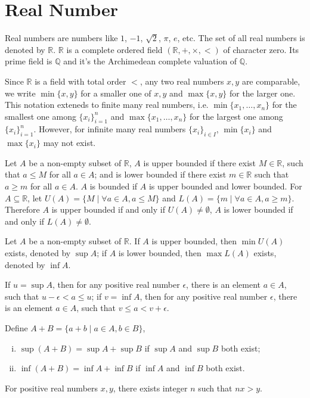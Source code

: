 \section{Real Number}
Real numbers are numbers like $1$, $-1$, $\sqrt 2$, $\pi$, $e$, etc.
The set of all real numbers is denoted by $\mathbb R$.
$\mathbb R$ is a complete ordered field $(\mathbb{R}, +, \times, <)$ of character zero.
Its prime field is $\mathbb{Q}$ and it's the Archimedean complete valuation of $\mathbb{Q}$.

Since $\mathbb{R}$ is a field with total order $<$, any two real numbers $x, y$ are comparable,
we write $\min\{x, y\}$ for a smaller one of $x, y$ and $\max\{x, y\}$ for the larger one.
This notation exteneds to finite many real numbers, i.e.
$\min\{x_1, \dots, x_n\}$ for the smallest one among $\{x_i\}_{i=1}^n$
and $\max\{x_1, \dots, x_n\}$ for the largest one among $\{x_i\}_{i=1}^n$.
However, for infinite many real numbers $\{x_i\}_{i \in I}$, $\min\{x_i\}$ and $\max\{x_i\}$ may not exist.

Let $A$ be a non-empty subset of $\mathbb{R}$, $A$ is upper bounded if there exist $M \in \mathbb{R}$,
such that $a \leq M$ for all $a \in A$;
and is lower bounded if there exist $m \in \mathbb{R}$ such that $a \geq m$ for all $a \in A$.
$A$ is bounded if $A$ is upper bounded and lower bounded.
For $A \subseteq \mathbb{R}$, let $U(A) = \{M \mid \forall a \in A, a \leq M\}$
and $L(A) = \{m \mid \forall a \in A, a \geq m\}$.
Therefore $A$ is upper bounded if and only if $U(A) \neq \emptyset$,
$A$ is lower bounded if and only if $L(A) \neq \emptyset$.

Let $A$ be a non-empty subset of $\mathbb{R}$.
If $A$ is upper bounded, then $\min U(A)$ exists, denoted by $\sup A$;
if $A$ is lower bounded, then $\max L(A)$ exists, denoted by $\inf A$.

\begin{pro}
If $u = \sup A$, then for any positive real number $\epsilon$, there is an element $a \in A$,
such that $u - \epsilon < a \leq u$;
if $v = \inf A$, then for any positive real number $\epsilon$, there is an element $a \in A$,
such that $v \leq a < v + \epsilon$.
\end{pro}

\begin{pro}
Define $A + B = \{a + b \mid a \in A, b \in B\}$,
\begin{enumerate}[i.]
\item $\sup(A + B) = \sup A + \sup B$ if $\sup A$ and $\sup B$ both exist;
\item $\inf(A + B) = \inf A + \inf B$ if $\inf A$ and $\inf B$ both exist.
\end{enumerate}
\end{pro}

\begin{pro}
For positive real numbers $x, y$, there exists integer $n$ such that $nx > y$.
\end{pro}
